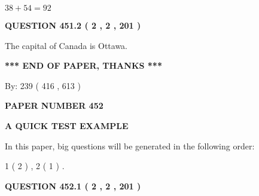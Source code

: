 \documentclass[12pt]{article}
\begin{document}
$ %
38 +  %
54=   %
92$
 
 
  
\vspace{0.2in}
  
{\textbf{\Large{QUESTION
451.2 
 ( 2 , 2 , 201 )
}}}
  
  
 
 
\noindent{}
 
 
The capital of Canada is Ottawa.
 
 
 
 
   
   
 \vspace{0.2in}
 
   
   
   
   
\vspace{1.0in} 
{\textbf{\large{ *** END OF PAPER, THANKS *** }}} 
   
   
\hspace{1.0in} By: 
 239 ( 416 ,  613 )
   
   
   
   
\newpage 
\setcounter{page}{ 
   452001 } 
   
   
   
   
 {\textbf{ \Large{ PAPER NUMBER  452  }}}
   
   
\vspace{0.2in}
   
   
   
   
   
   
 \vspace{0.2in}
{\LARGE {\textbf{ A QUICK TEST EXAMPLE}}}
   
   
   
\vspace{0.2in}
   
In this paper, big questions will be generated in the following order: 
   
   
   1 ( 2 )
 ,
   2 ( 1 )
 .
  
\vspace{0.2in}
  
{\textbf{\Large{QUESTION
452.1 
 ( 2 , 2 , 201 )
}}}
  
  
 
 
\noindent{}
 
\end{document}
